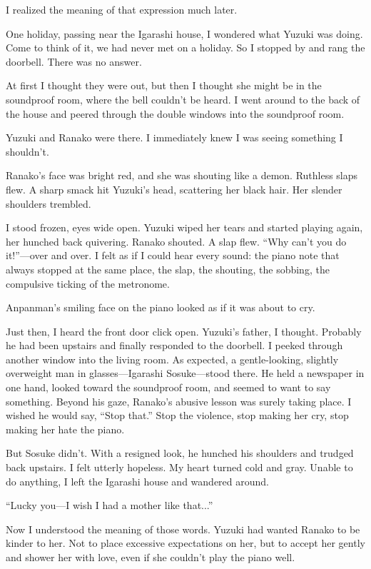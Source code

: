 \documentclass[
    a4paper,
    12pt,
    twoside,
    openany,
    UTF8,
    fontset=windows
]{ctexbook}
\begin{document}
I realized the meaning of that expression much later.

One holiday, passing near the Igarashi house, I wondered what Yuzuki was doing. Come to think of it, we had never met on a holiday. So I stopped by and rang the doorbell. There was no answer.

At first I thought they were out, but then I thought she might be in the soundproof room, where the bell couldn't be heard. I went around to the back of the house and peered through the double windows into the soundproof room.

Yuzuki and Ranako were there. I immediately knew I was seeing something I shouldn't.

Ranako's face was bright red, and she was shouting like a demon. Ruthless slaps flew. A sharp smack hit Yuzuki's head, scattering her black hair. Her slender shoulders trembled.

I stood frozen, eyes wide open. Yuzuki wiped her tears and started playing again, her hunched back quivering. Ranako shouted. A slap flew. ``Why can't you do it!''---over and over. I felt as if I could hear every sound: the piano note that always stopped at the same place, the slap, the shouting, the sobbing, the compulsive ticking of the metronome.

Anpanman's smiling face on the piano looked as if it was about to cry.

Just then, I heard the front door click open. Yuzuki's father, I thought. Probably he had been upstairs and finally responded to the doorbell. I peeked through another window into the living room. As expected, a gentle-looking, slightly overweight man in glasses---Igarashi Sosuke---stood there. He held a newspaper in one hand, looked toward the soundproof room, and seemed to want to say something. Beyond his gaze, Ranako's abusive lesson was surely taking place. I wished he would say, ``Stop that.'' Stop the violence, stop making her cry, stop making her hate the piano.

But Sosuke didn't. With a resigned look, he hunched his shoulders and trudged back upstairs. I felt utterly hopeless. My heart turned cold and gray. Unable to do anything, I left the Igarashi house and wandered around.

``Lucky you---I wish I had a mother like that...''

Now I understood the meaning of those words. Yuzuki had wanted Ranako to be kinder to her. Not to place excessive expectations on her, but to accept her gently and shower her with love, even if she couldn't play the piano well.
\end{document}
